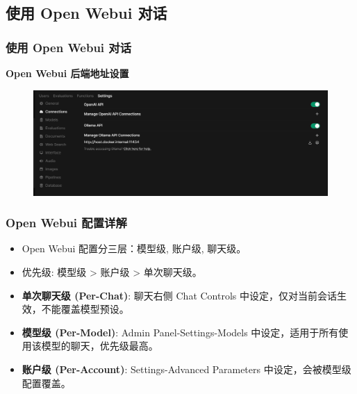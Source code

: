 \subsection{使用 Open Webui 对话}
\begin{frame}
\frametitle{使用 Open Webui 对话}
\textbf{Open Webui 后端地址设置}
\begin{figure}
    \centering
    \includegraphics[width=\textwidth]{./pic/1.png} %
    \label{fig:openwebui_backend}
\end{figure}
\end{frame}

\begin{frame}
\frametitle{Open Webui 配置详解}
\begin{itemize}
    \item Open Webui 配置分三层：模型级, 账户级, 聊天级。
    \item 优先级: 模型级 > 账户级 > 单次聊天级。
    \item \textbf{单次聊天级 (Per-Chat)}: 聊天右侧 Chat Controls 中设定，仅对当前会话生效，不能覆盖模型预设。
    \item \textbf{模型级 (Per-Model)}: Admin Panel-Settings-Models 中设定，适用于所有使用该模型的聊天，优先级最高。
    \item \textbf{账户级 (Per-Account)}: Settings-Advanced Parameters 中设定，会被模型级配置覆盖。
\end{itemize}
\end{frame}

